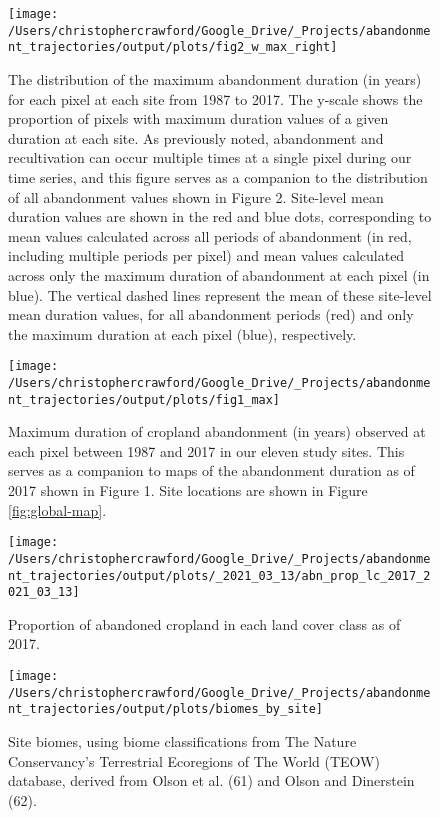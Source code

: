 \documentclass[9pt,twocolumn,twoside,lineno]{pnas-new}
\begin{document}
\begin{figure}
\texttt{[image: /Users/christophercrawford/Google\_Drive/\_Projects/abandonment\_trajectories/output/plots/fig2\_w\_max\_right]} \caption{The distribution of the maximum abandonment duration (in years) for each pixel at each site from 1987 to 2017. The y-scale shows the proportion of pixels with maximum duration values of a given duration at each site. As previously noted, abandonment and recultivation can occur multiple times at a single pixel during our time series, and this figure serves as a companion to the distribution of all abandonment values shown in Figure 2. Site-level mean duration values are shown in the red and blue dots, corresponding to mean values calculated across all periods of abandonment (in red, including multiple periods per pixel) and mean values calculated across only the maximum duration of abandonment at each pixel (in blue). The vertical dashed lines represent the mean of these site-level mean duration values, for all abandonment periods (red) and only the maximum duration at each pixel (blue), respectively.}\label{fig:mean-abn-duration-w-max}
\end{figure}



\begin{figure}
\texttt{[image: /Users/christophercrawford/Google\_Drive/\_Projects/abandonment\_trajectories/output/plots/fig1\_max]} \caption{Maximum duration of cropland abandonment (in years) observed at each pixel between 1987 and 2017 in our eleven study sites. This serves as a companion to maps of the abandonment duration as of 2017 shown in Figure 1. Site locations are shown in Figure \ref{fig:global-map}.}\label{fig:maps-max-abn-duration}
\end{figure}



\begin{figure}
\texttt{[image: /Users/christophercrawford/Google\_Drive/\_Projects/abandonment\_trajectories/output/plots/\_2021\_03\_13/abn\_prop\_lc\_2017\_2021\_03\_13]} \caption{Proportion of abandoned cropland in each land cover class as of 2017.}\label{fig:abn-prop-lc}
\end{figure}



\begin{figure}
\texttt{[image: /Users/christophercrawford/Google\_Drive/\_Projects/abandonment\_trajectories/output/plots/biomes\_by\_site]} \caption{Site biomes, using biome classifications from The Nature Conservancy's Terrestrial Ecoregions of The World (TEOW) database, derived from Olson et al. (61) and Olson and Dinerstein (62).}\label{fig:site-biomes}
\end{figure}
\end{document}
